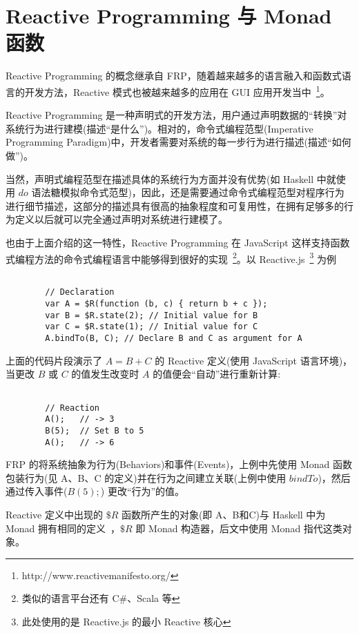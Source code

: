 \section{Reactive Programming 与 Monad 函数}

Reactive Programming 的概念继承自 FRP，随着越来越多的语言融入和函数式语言的开发方法，Reactive 模式也被越来越多的应用在 GUI 应用开发当中~\footnote{http://www.reactivemanifesto.org/}。

Reactive Programming 是一种声明式的开发方法，用户通过声明数据的“转换”对系统行为进行建模(描述“是什么”)。相对的，命令式编程范型(Imperative Programming Paradigm)中，开发者需要对系统的每一步行为进行描述(描述“如何做”)。

当然，声明式编程范型在描述具体的系统行为方面并没有优势(如 Haskell 中就使用 $do$ 语法糖模拟命令式范型)，因此，还是需要通过命令式编程范型对程序行为进行细节描述，这部分的描述具有很高的抽象程度和可复用性，在拥有足够多的行为定义以后就可以完全通过声明对系统进行建模了。

也由于上面介绍的这一特性，Reactive Programming 在 JavaScript 这样支持函数式编程方法的命令式编程语言中能够得到很好的实现~\footnote{类似的语言平台还有 C\#、Scala 等}。以 Reactive.js~\footnote{此处使用的是 Reactive.js 的最小 Reactive 核心} 为例~\cite{Carkci2013}

\begin{verbatim}

        // Declaration
        var A = $R(function (b, c) { return b + c });
        var B = $R.state(2); // Initial value for B
        var C = $R.state(1); // Initial value for C
        A.bindTo(B, C); // Declare B and C as argument for A

\end{verbatim}

上面的代码片段演示了 $A = B + C$ 的 Reactive 定义(使用 JavaScript 语言环境)，当更改 $B$ 或 $C$ 的值发生改变时 $A$ 的值便会“自动”进行重新计算:

\begin{verbatim}

        // Reaction
        A();   // -> 3
        B(5);  // Set B to 5
        A();   // -> 6

\end{verbatim}

FRP 的将系统抽象为行为(Behaviors)和事件(Events)，上例中先使用 Monad 函数包装行为(见 A、B、C 的定义)并在行为之间建立关联(上例中使用 $bindTo$)，然后通过传入事件($B(5);$) 更改“行为”的值。

Reactive 定义中出现的 $\$R$ 函数所产生的对象(即 A、B和C)与 Haskell 中为 Monad 拥有相同的定义~\cite{raey}，$\$R$ 即 Monad 构造器，后文中使用 Monad 指代这类对象。

